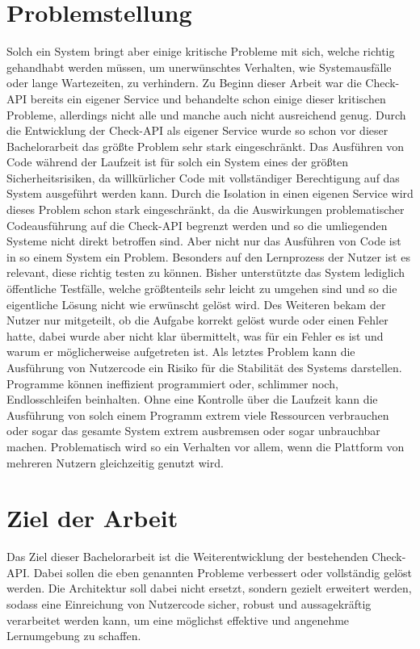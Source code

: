 \section{Problemstellung}
Solch ein System bringt aber einige kritische Probleme mit sich, welche richtig gehandhabt werden müssen, um unerwünschtes Verhalten, wie Systemausfälle oder lange Wartezeiten, zu verhindern. Zu Beginn dieser Arbeit war die Check-API bereits ein eigener Service und behandelte schon einige dieser kritischen Probleme, allerdings nicht alle und manche auch nicht ausreichend genug.
Durch die Entwicklung der Check-API als eigener Service wurde so schon vor dieser Bachelorarbeit das größte Problem sehr stark eingeschränkt. Das Ausführen von Code während der Laufzeit ist für solch ein System eines der größten Sicherheitsrisiken, da willkürlicher Code mit vollständiger Berechtigung auf das System ausgeführt werden kann. Durch die Isolation in einen eigenen Service wird dieses Problem schon stark eingeschränkt, da die Auswirkungen problematischer Codeausführung auf die Check-API begrenzt werden und so die umliegenden Systeme nicht direkt betroffen sind.
Aber nicht nur das Ausführen von Code ist in so einem System ein Problem. Besonders auf den Lernprozess der Nutzer ist es relevant, diese richtig testen zu können. Bisher unterstützte das System lediglich öffentliche Testfälle, welche größtenteils sehr leicht zu umgehen sind und so die eigentliche Lösung nicht wie erwünscht gelöst wird. Des Weiteren bekam der Nutzer nur mitgeteilt, ob die Aufgabe korrekt gelöst wurde oder einen Fehler hatte, dabei wurde aber nicht klar übermittelt, was für ein Fehler es ist und warum er möglicherweise aufgetreten ist.
Als letztes Problem kann die Ausführung von Nutzercode ein Risiko für die Stabilität des Systems darstellen. Programme können ineffizient programmiert oder, schlimmer noch, Endlosschleifen beinhalten. Ohne eine Kontrolle über die Laufzeit kann die Ausführung von solch einem Programm extrem viele Ressourcen verbrauchen oder sogar das gesamte System extrem ausbremsen oder sogar unbrauchbar machen. Problematisch wird so ein Verhalten vor allem, wenn die Plattform von mehreren Nutzern gleichzeitig genutzt wird.

\section{Ziel der Arbeit}
Das Ziel dieser Bachelorarbeit ist die Weiterentwicklung der bestehenden Check-API. Dabei sollen die eben genannten Probleme verbessert oder vollständig gelöst werden. Die Architektur soll dabei nicht ersetzt, sondern gezielt erweitert werden, sodass eine Einreichung von Nutzercode sicher, robust und aussagekräftig verarbeitet werden kann, um eine möglichst effektive und angenehme Lernumgebung zu schaffen.

